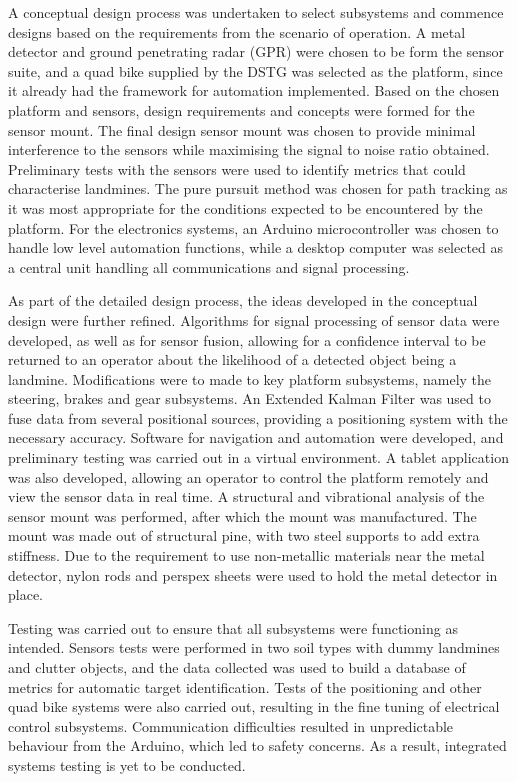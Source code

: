 \documentclass[main.tex]{subfiles}
\begin{document}
A conceptual design process was undertaken to select subsystems and commence designs based on the requirements from the scenario of operation. A metal detector and ground penetrating radar (GPR) were chosen to be form the sensor suite, and a quad bike supplied by the DSTG was selected as the platform, since it already had the framework for automation implemented. Based on the chosen platform and sensors, design requirements and concepts were formed for the sensor mount. The final design sensor mount was chosen to provide minimal interference to the sensors while maximising the signal to noise ratio obtained. Preliminary tests with the sensors were used to identify metrics that could characterise landmines. The pure pursuit method was chosen for path tracking as it was most appropriate for the conditions expected to be encountered by the platform. For the electronics systems, an Arduino microcontroller was chosen to handle low level automation functions, while a desktop computer was selected as a central unit handling all communications and signal processing. 

As part of the detailed design process, the ideas developed in the conceptual design were further refined. Algorithms for signal processing of sensor data were developed, as well as for sensor fusion, allowing for a confidence interval to be returned to an operator about the likelihood of a detected object being a landmine. Modifications were to made to key platform subsystems, namely the steering, brakes and gear subsystems. An Extended  Kalman Filter was used to fuse data from several positional sources, providing a positioning system with the necessary accuracy. Software for navigation and automation were developed, and preliminary testing was carried out in a virtual environment. A tablet application was also developed, allowing an operator to control the platform remotely and view the sensor data in real time. A structural and vibrational analysis of the sensor mount was performed, after which the mount was manufactured. The mount was made out of structural pine, with two steel supports to add extra stiffness. Due to the requirement to use non-metallic materials near the metal detector, nylon rods and perspex sheets were used to hold the metal detector in place.    

Testing was carried out to ensure that all subsystems were functioning as intended. Sensors tests were performed in two soil types with dummy landmines and clutter objects, and the data collected was used to build a database of metrics for automatic target identification. Tests of the positioning and other quad bike systems were also carried out, resulting in the fine tuning of electrical control subsystems. Communication difficulties resulted in unpredictable behaviour from the Arduino, which led to safety concerns. As a result, integrated systems testing is yet to be conducted. 
\end{document}
